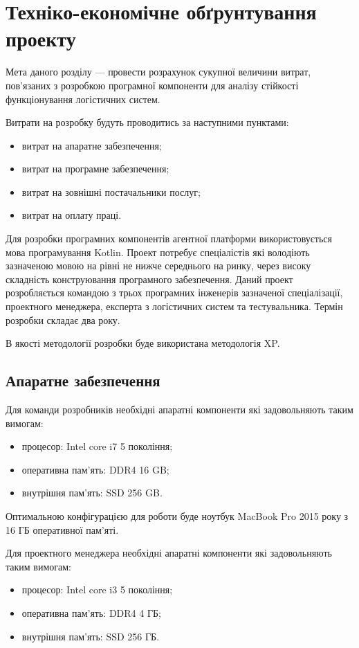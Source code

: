 \section{Техніко-економічне обґрунтування проекту}
Мета даного розділу --- провести розрахунок сукупної величини витрат, пов'язаних з розробкою програмної компоненти для аналізу стійкості функціонування логістичних систем.

Витрати на розробку будуть проводитись за наступними пунктами:
\begin{itemize}
	\item витрат на апаратне забезпечення;
	\item витрат на програмне забезпечення;
	\item витрат на зовнішні постачальники послуг;
	\item витрат на оплату праці.
\end{itemize}

Для розробки програмних компонентів агентної платформи використовується мова програмування Kotlin.
Проект потребує спеціалістів які володіють зазначеною мовою на рівні не нижче середнього на ринку, через високу складність конструювання програмного забезпечення.
Даний проект розробляється командою з трьох програмних інженерів зазначеної спеціалізації, проектного менеджера, експерта з логістичних систем та тестувальника.
Термін розробки складає два року.

В якості методології розробки буде використана методологія XP.

\subsection{Апаратне забезпечення}
Для команди розробників необхідні апаратні компоненти які задовольняють таким вимогам:
\begin{itemize}
	\item процесор: Intel core i7 5 покоління;
	\item оперативна пам'ять: DDR4 16 GB;
	\item внутрішня пам'ять: SSD 256 GB.
\end{itemize}

Оптимальною конфігурацією для роботи буде ноутбук MacBook Pro 2015 року з 16 ГБ оперативної пам'яті.

Для проектного менеджера необхідні апаратні компоненти які задовольняють таким вимогам:
\begin{itemize}
	\item процесор: Intel core i3 5 покоління;
	\item оперативна пам'ять: DDR4 4 ГБ;
	\item внутрішня пам'ять: SSD 256 ГБ.
\end{itemize}

